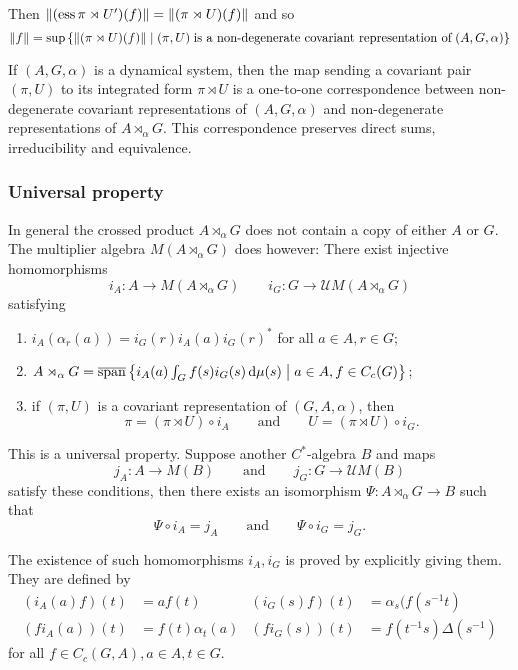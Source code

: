 Then $\lVert(\operatorname{ess}\pi\rtimes U')(f)\rVert = \lVert(\pi\rtimes U)(f)\rVert$ and so
\[ \lVert f\rVert =\sup\left\{ \lVert(\pi\rtimes U)(f)\rVert \;\middle|\; (\pi, U)\;\text{is a non-degenerate covariant representation of} \; (A,G,\alpha) \right\} \]

\begin{proposition}
If $(A,G,\alpha)$ is a dynamical system, then the map sending
a covariant pair $(\pi, U)$ to its integrated form $\pi\rtimes U$ is a one-to-one correspondence
between non-degenerate covariant representations of $(A, G, \alpha)$ and non-degenerate
representations of $A\rtimes_\alpha G$. This correspondence preserves direct sums, irreducibility
and equivalence.
\end{proposition}

\subsubsection{Universal property}

In general the crossed product $A\rtimes_\alpha G$ does not contain a copy of either $A$ or $G$. The multiplier algebra $M(A\rtimes_\alpha G)$ does however: There exist injective homomorphisms
\[ i_A: A\to M(A\rtimes_\alpha G) \qquad i_G: G\to \mathcal{U}M(A\rtimes_\alpha G) \]
satisfying
\begin{enumerate}
\item $i_A(\alpha_r(a)) = i_G(r)i_A(a)i_G(r)^*$ for all $a\in A, r\in G$;
\item $A \rtimes_\alpha G = \overline{\operatorname{span}}\left\{ i_A(a)\int_Gf(s)i_G(s)\operatorname{d \!}\mu(s) \;\middle|\; a\in A, f\in C_c(G) \right\}$;
\item if $(\pi, U)$ is a covariant representation of $(G,A,\alpha)$, then
\[ \pi = (\pi\rtimes U)\circ i_A \qquad \text{and} \qquad U = (\pi \rtimes U)\circ i_G. \]
\end{enumerate}
This is a universal property. Suppose another $C^*$-algebra $B$ and maps
\[ j_A: A\to M(B) \qquad \text{and} \qquad j_G: G\to \mathcal{U}M(B) \]
satisfy these conditions, then there exists an isomorphism $\Psi: A\rtimes_\alpha G \to B$ such that
\[ \Psi \circ i_A = j_A \qquad \text{and} \qquad \Psi\circ i_G = j_G. \]

The existence of such homomorphisms $i_A,i_G$ is proved by explicitly giving them.
They are defined by
\begin{align*}
(i_A(a)f)(t) &= af(t) & (i_G(s)f)(t) &= \alpha_s(f(s^{-1}t) \\
(fi_A(a))(t) &= f(t)\alpha_t(a) & (fi_G(s))(t) &= f(t^{-1}s)\Delta(s^{-1})
\end{align*}
for all $f\in C_c(G,A), a\in A, t\in G$.


